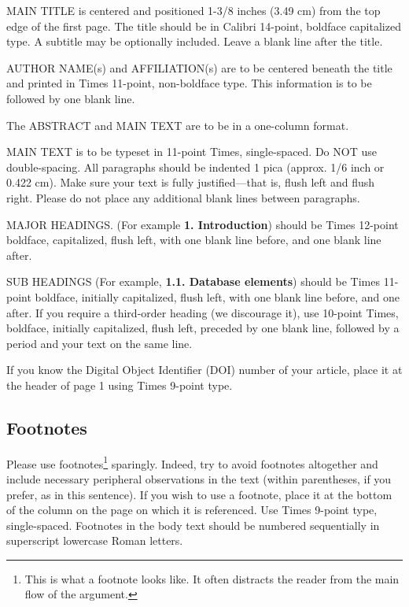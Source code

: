 MAIN TITLE is centered and positioned 1-3/8 inches (3.49 cm) from the top edge of the first page. The title should be in Calibri 14-point, boldface capitalized type. A subtitle may be optionally included. Leave a blank line after the title.

AUTHOR NAME(s) and AFFILIATION(s) are to be centered beneath the title and printed in Times 11-point, non-boldface type. This information is to be followed by one blank line.

The ABSTRACT and MAIN TEXT are to be in a one-column format.

MAIN TEXT is to be typeset in 11-point Times, single-spaced. Do NOT use double-spacing. All paragraphs should be indented 1 pica (approx. 1/6 inch or 0.422 cm). Make sure your text is fully justified---that is, flush left and flush right. Please do not place any additional blank lines between paragraphs.

MAJOR HEADINGS. (For example \textbf{1. Introduction}) should be Times 12-point boldface, capitalized, flush left, with one blank line before, and one blank line after.

SUB HEADINGS (For example, \textbf{1.1. Database elements}) should be Times 11-point boldface, initially capitalized, flush left, with one blank line before, and one after. If you require a third-order heading (we discourage it), use 10-point Times, boldface, initially capitalized, flush left, preceded by one blank line, followed by a period and your text on the same line.

If you know the Digital Object Identifier (DOI) number of your article, place it at the header of page 1 using Times 9-point type.


\subsection{Footnotes}

Please use footnotes\footnote{This is what a footnote looks like.  It often distracts the reader from the main flow of the argument.} sparingly. Indeed, try to avoid footnotes altogether and include necessary peripheral observations in the text (within parentheses, if you prefer, as in this sentence).  If you wish to use a footnote, place it at the bottom of the column on the page on which it is referenced. Use Times 9-point type, single-spaced. Footnotes in the body text should be numbered sequentially in superscript lowercase Roman letters.  


